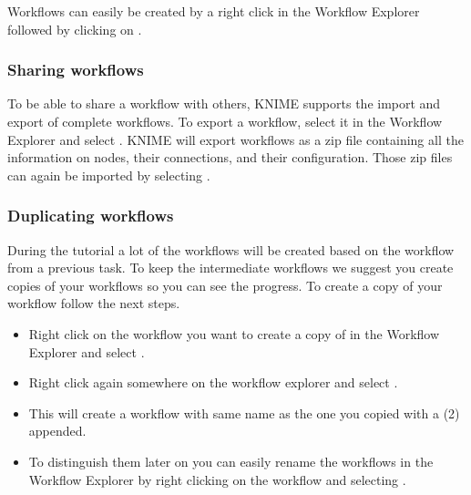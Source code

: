 Workflows can easily be created by a right click in the Workflow Explorer followed by clicking on .

\subsubsection{Sharing workflows}
\label{sec:sharing_workflows}

To be able to share a workflow with others, KNIME supports the import and export of complete workflows.
To export a workflow, select it in the Workflow Explorer and select .
KNIME will export workflows as a zip file containing all the information on nodes, their connections, and their configuration.
Those zip files can again be imported by selecting .


\subsubsection{Duplicating workflows}
\label{sec:duplicate-wf}

During the tutorial a lot of the workflows will be created based on the workflow from a previous task.
To keep the intermediate workflows we suggest you create copies of your workflows so you can see the progress.
To create a copy of your workflow follow the next steps.

\begin{itemize}
\item
Right click on the workflow you want to create a copy of in the Workflow Explorer and select .
\item
Right click again somewhere on the workflow explorer and select .
\item
This will create a workflow with same name as the one you copied with a (2) appended.
\item
To distinguish them later on you can easily rename the workflows in the Workflow Explorer by right clicking on the workflow and selecting . 
\end{itemize}

